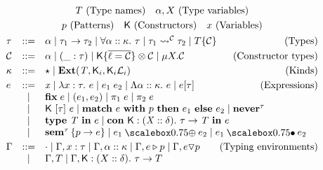 \begin{gather*}
  T~\text{(Type names)}\quad \alpha,X~\text{(Type variables)} \\
  p~\text{(Patterns)}\quad \fnlab{K}~\text{(Constructors)} \quad x~\text{(Variables)} \\
  \begin{array}{lcl}
    \tau &::=& \tyvar{\alpha} \mid \tyarr{\tau_1}{\tau_2} \mid \tyall{\alpha}{\kappa}{\tau} \mid \tysem{\tau_1}{\con}{\tau_2} \mid \tydata{T}{\con} \qquad\hfill\text{(Types)}\\[1mm]
    \con &::=& \alpha \mid (\_ : \tau) \mid \fnlab{K}\{\overline{\ell = \con}\} \otimes \con \mid \mu X. \con  \qquad\hfill\text{(Constructor types)}\\[1mm]
    \kappa &::=& \kitype{} \mid \fnkey{Ext}(\tname, \fnlab{K}_i, \fnlab{K}_i\mathcal{L}_i) \qquad\hfill\text{(Kinds)}\\[1mm]
    e &::=& \tmvar{x} \mid \tmlam{x}{\tau}{e} \mid \tmapp{e_1}{e_2} \mid \tmtylam{\alpha}{\kappa}{e} \mid \tmtyapp{e}{\tau} \qquad\hfill\text{(Expressions)}\\
         & \mid & \tmfix{e} \mid \tmprod{e_1}{e_2} \mid \tmproj{1}{e} \mid \tmproj{2}{e} \\
         & \mid & \tmconapp{K}{\tau}{e} \mid \tmmatch{e}{p}{e_1}{e_2} \mid \tmnever{\tau} \\
         & \mid & \tmtype{T}{e} \mid \tmcondef{K}{X}{\delta}{\tau}{T}{e} \\
         & \mid & \tmsem{\tau}{p}{e} \mid \tmcomp{e_1}{e_2} \mid \tmsemapp{e_1}{e_2}\\[1mm]
    \Gamma &::=& \cdot \mid \Gamma, x : \tau \mid \Gamma, \alpha :: \kappa \mid \Gamma, \envmatch{e}{p} \mid \Gamma, \envnomatch{e}{p} \qquad\hfill\text{(Typing environments)}\\
         &\mid& \Gamma, T \mid \Gamma, \fnlab{K} : (X :: \delta).~\tau \to T
  \end{array}
\end{gather*}
